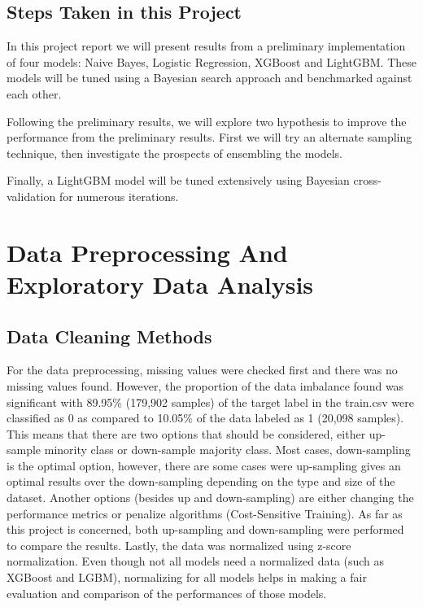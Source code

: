 \documentclass[journal,twoside,web]{ieeecolor}
\begin{document}
\subsection{Steps Taken in this Project}
In this project report we will present results from a preliminary implementation of four models: Naive Bayes, Logistic Regression, XGBoost and LightGBM. These models will be tuned using a Bayesian search approach and benchmarked against each other.

Following the preliminary results, we will explore two hypothesis to improve the performance from the preliminary results. First we will try an alternate sampling technique, then investigate the prospects of ensembling the models.

Finally, a LightGBM model will be tuned extensively using Bayesian cross-validation for numerous iterations. 

\section{Data Preprocessing And Exploratory Data Analysis}


\subsection{Data Cleaning Methods}
For the data preprocessing, missing values were checked first and there was no missing values found. However, the proportion of the data imbalance found was significant with 89.95\% (179,902 samples) of the target label in the train.csv were classified as 0 as compared to 10.05\% of the data labeled as 1 (20,098 samples). This means that there are two options that should be considered, either up-sample minority class or down-sample majority class. Most cases, down-sampling is the optimal option, however, there are some cases were up-sampling gives an optimal results over the down-sampling depending on the type and size of the dataset. Another options (besides up and down-sampling) are either changing the performance metrics or penalize algorithms (Cost-Sensitive Training). As far as this project is concerned, both up-sampling and down-sampling were performed to compare the results. Lastly, the data was normalized using z-score normalization. Even though not all models need a normalized data (such as XGBoost and LGBM), normalizing for all models helps in making a fair evaluation and comparison of the performances of those models. 
\end{document}

